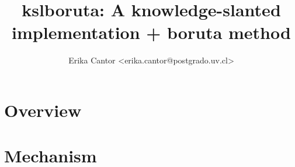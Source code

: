 \documentclass{article}
\title{kslboruta: A knowledge-slanted implementation + boruta method}
\author{Erika Cantor <erika.cantor@postgrado.uv.cl>}
\begin{document}



\maketitle
{}
\section{Overview}

\section{Mechanism}
\end{document}
